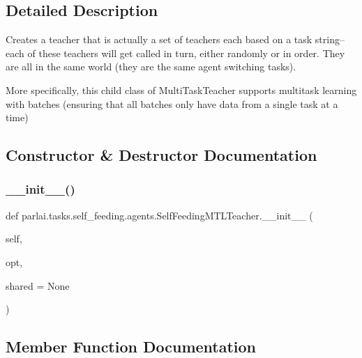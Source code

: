 \subsection{Detailed Description}
\begin{DoxyVerb}Creates a teacher that is actually a set of teachers each based on a task string--
each of these teachers will get called in turn, either randomly or in order. They
are all in the same world (they are the same agent switching tasks).

More specifically, this child class of MultiTaskTeacher supports multitask learning
with batches (ensuring that all batches only have data from a single task at a time)
\end{DoxyVerb}
 

\subsection{Constructor \& Destructor Documentation}
\mbox{\label{classparlai_1_1tasks_1_1self__feeding_1_1agents_1_1SelfFeedingMTLTeacher_a422eb4bb783b661fb071405964faa27b}} 
\subsubsection{\texorpdfstring{\+\_\+\+\_\+init\+\_\+\+\_\+()}{\_\_init\_\_()}}
{\footnotesize\ttfamily def parlai.\+tasks.\+self\+\_\+feeding.\+agents.\+Self\+Feeding\+M\+T\+L\+Teacher.\+\_\+\+\_\+init\+\_\+\+\_\+ (\begin{DoxyParamCaption}\item[{}]{self,  }\item[{}]{opt,  }\item[{}]{shared = {\ttfamily None} }\end{DoxyParamCaption})}



\subsection{Member Function Documentation}
\mbox{\label{classparlai_1_1tasks_1_1self__feeding_1_1agents_1_1SelfFeedingMTLTeacher_ac4ee43a50c54d2033be6eb5731650ab3}} 
